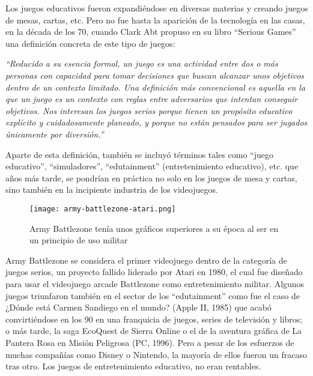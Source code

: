Los juegos educativos fueron expandiéndose en diversas materias y creando juegos de mesas, cartas, etc. Pero no fue hasta la aparición de la tecnología en las casas, en la década de los 70, cuando Clark Abt propuso en su libro ``Serious Games''\cite{ccabt} una definición concreta de este tipo de juegos:

\emph{``Reducido a su esencia formal, un juego es una actividad entre dos o más personas con capacidad para tomar decisiones que buscan alcanzar unos objetivos dentro de un contexto limitado. Una definición más convencional es aquella en la que un juego es un contexto con reglas entre adversarios que intentan conseguir objetivos. Nos interesan los juegos serios porque tienen un propósito educativo explícito y cuidadosamente planeado, y porque no están pensados para ser jugados únicamente por diversión.''}

Aparte de esta definición, también se incluyó términos tales como ``juego educativo'', ``simuladores'', ``edutainment'' (entretenimiento educativo), etc. que años más tarde, se pondrían en práctica no solo en los juegos de mesa y cartas, sino también en la incipiente industria de los videojuegos. 

\begin{figure}[H] 
	\begin{center}
		\texttt{[image: army-battlezone-atari.png]}
	\end{center}
	\caption{Army Battlezone tenía unos gráficos superiores a su época al ser en un principio de uso militar}
	\label{fig:army-battlezone-atari}
\end{figure}

Army Battlezone  se considera el primer videojuego dentro de la categoría de juegos serios, un proyecto fallido liderado por Atari en 1980, el cual fue diseñado para usar el videojuego arcade Battlezone como entretenimiento militar. Algunos juegos triunfaron también en el sector de los ``edutainment'' como fue el caso de ¿Dónde está Carmen Sandiego en el mundo?  (Apple II, 1985) que acabó convirtiéndose en los 90 en una franquicia de juegos, series de televisión y libros; o más tarde, la saga EcoQuest  de Sierra Online o el de la aventura gráfica de La Pantera Rosa en Misión Peligrosa  (PC, 1996). Pero a pesar de los esfuerzos de muchas compañías como Disney o Nintendo, la mayoría de ellos fueron un fracaso tras otro. Los juegos de entretenimiento educativo, no eran rentables. 

